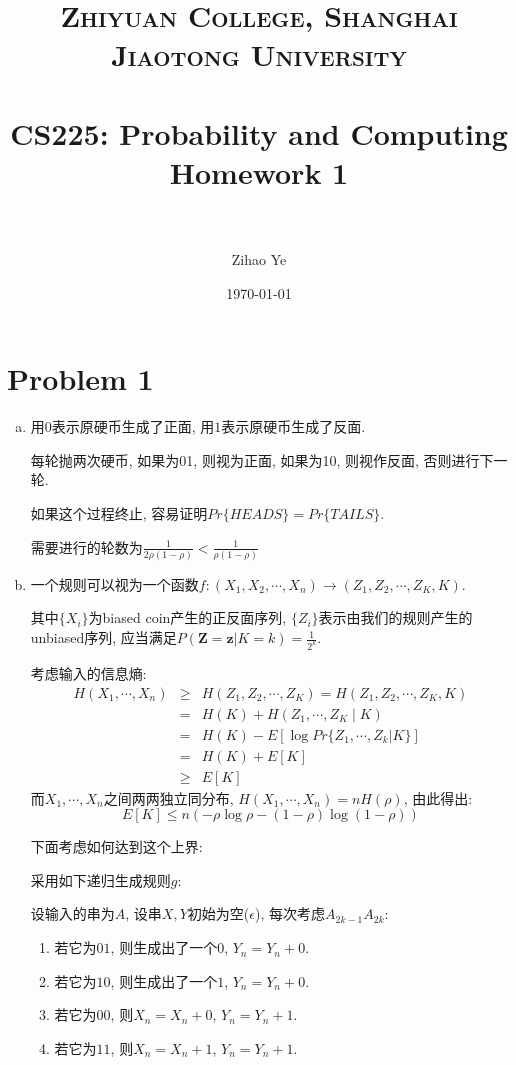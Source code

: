 \documentclass[paper=a4, fontsize=11pt]{scrartcl} %
\title{	
\normalfont \normalsize 
\textsc{Zhiyuan College, Shanghai Jiaotong University} \\ %
\horrule{0.5pt} \\[0.4cm] %
\huge CS225: Probability and Computing Homework 1 \\ %
\horrule{2pt} \\ %
}
\author{Zihao Ye} %
\date{\normalsize\today} %
\numberwithin{equation}{section} %
\numberwithin{figure}{section} %
\numberwithin{table}{section} %
\begin{document}
\maketitle %

\section*{Problem 1}
\begin{enumerate}[(a)]
	\item 
	用$0$表示原硬币生成了正面, 用$1$表示原硬币生成了反面.

	每轮抛两次硬币, 如果为01, 则视为正面, 如果为10, 则视作反面, 否则进行下一轮.

	如果这个过程终止, 容易证明$Pr\{HEADS\} = Pr\{TAILS\}$.

	需要进行的轮数为$\frac{1}{2\rho(1-\rho)}<\frac{1}{\rho(1-\rho)}$
	\item 
	一个规则可以视为一个函数$f:(X_1,X_2,\cdots,X_n)\longrightarrow (Z_1, Z_2, \cdots, Z_K, K)$.

	其中$\{X_i\}$为biased coin产生的正反面序列, $\{Z_i\}$表示由我们的规则产生的unbiased序列, 应当满足$P(\mathbf{Z} = \mathbf{z}|K=k) = \frac{1}{2^k}$.

	考虑输入的信息熵:
	\begin{eqnarray}
		H(X_1,\cdots, X_n)& \geq & H(Z_1, Z_2, \cdots, Z_K) = H(Z_1, Z_2, \cdots, Z_K, K) \\
						  & = & H(K) + H(Z_1, \cdots, Z_K \mid K)\\
						  & = & H(K) - E[\log Pr\{Z_1,\cdots, Z_k | K\}] \\
						  & = & H(K) + E[K] \\
						  & \geq & E[K]
	\end{eqnarray}
	而$X_1,\cdots,X_n$之间两两独立同分布, $H(X_1, \cdots, X_n) = nH(\rho)$, 由此得出:
	$$E[K] \leq n(-\rho \log \rho - (1-\rho) \log (1-\rho)) $$

	下面考虑如何达到这个上界:

	采用如下递归生成规则$g$:

	设输入的串为$A$, 设串$X,Y$初始为空($\epsilon$), 每次考虑$A_{2k-1}A_{2k}$:

	\begin{enumerate}
	\item
	若它为$01$, 则生成出了一个$0$, $Y_n = Y_n + 0$.
	\item
	若它为$10$, 则生成出了一个$1$, $Y_n = Y_n + 0$.
	\item
	若它为$00$, 则$X_n = X_n + 0$, $Y_n = Y_n + 1$.
	\item
	若它为$11$, 则$X_n = X_n + 1$, $Y_n = Y_n + 1$.
	\end{enumerate}


\end{enumerate}
\end{document}
